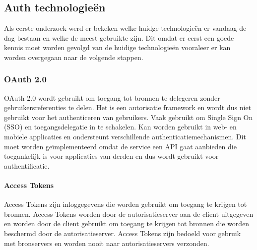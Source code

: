 \chapter{}%
\label{ch:stand-van-zaken}


\
\section{Auth technologieën}%
\label{sec:auth-technologieën}
Als eerste onderzoek werd er bekeken welke huidge technologieën er vandaag de dag bestaan en welke de meest gebruikte zijn. Dit omdat er eerst een goede kennis
moet worden gevolgd van de huidige technologieën vooraleer er kan worden overgegaan naar de volgende stappen.


\subsection{OAuth 2.0}%
\label{subsec:oauth-2.0}
OAuth 2.0 wordt gebruikt om toegang tot bronnen te delegeren zonder gebruikersreferenties te delen. Het is een autorisatie framework en wordt dus niet gebruikt voor het authenticeren van gebruikers. Vaak gebruikt om Single Sign On (SSO) en toegangsdelegatie in te schakelen. Kan worden gebruikt in web- en mobiele applicaties en ondersteunt verschillende authenticatiemechanismen.
Dit moet worden geïmplementeerd omdat de service een API gaat aanbieden die toegankelijk is voor applicaties van derden en dus wordt gebruikt voor authentificatie.

\subsubsection{Access Tokens}%
\label{subsubsec:access-tokens}
Access Tokens zijn inloggegevens die worden gebruikt om toegang te krijgen tot bronnen. Access Tokens worden door de autorisatieserver aan de client uitgegeven en worden door de client gebruikt om toegang te krijgen tot bronnen die worden beschermd door de autorisatieserver. Access Tokens zijn bedoeld voor gebruik met bronservers en worden nooit naar autorisatieservers verzonden.

